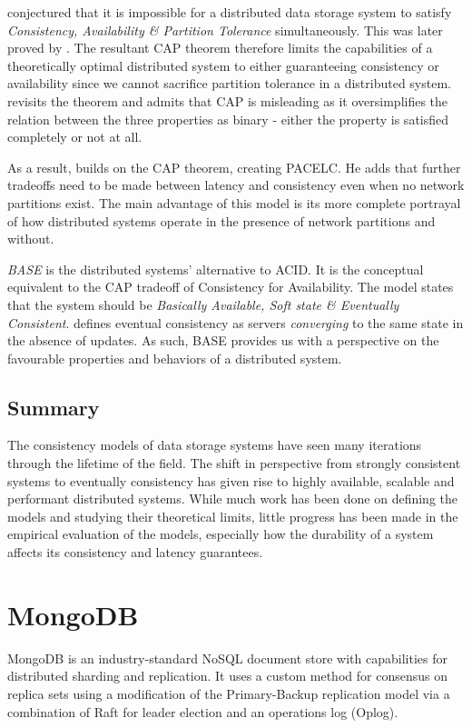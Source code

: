 \citet{cap} conjectured that it is impossible for a distributed data storage system to satisfy \textit{Consistency, Availability \& Partition Tolerance} simultaneously. This was later proved by \citet{cap-proof}. The resultant CAP theorem therefore limits the capabilities of a theoretically optimal distributed system to either guaranteeing consistency or availability since we cannot sacrifice partition tolerance in a distributed system. \citet{cap-years-after} revisits the theorem and admits that CAP is misleading as it oversimplifies the relation between the three properties as binary - either the property is satisfied completely or not at all. 

As a result, \citet{pacelc} builds on the CAP theorem, creating PACELC. He adds that further tradeoffs need to be made between latency and consistency even when no network partitions exist. The main advantage of this model is its more complete portrayal of how distributed systems operate in the presence of network partitions and without.

\textit{BASE} \citep{base} is the distributed systems' alternative to ACID. It is the conceptual equivalent to the CAP tradeoff of Consistency for Availability. The model states that the system should be \textit{Basically Available, Soft state \& Eventually Consistent}. \citet{eventual-consistency} defines eventual consistency as servers \textit{converging} to the same state in the absence of updates. As such, BASE provides us with a perspective on the favourable properties and behaviors of a distributed system.

\subsection{Summary}
The consistency models of data storage systems have seen many iterations through the lifetime of the field. The shift in perspective from strongly consistent systems to eventually consistency has given rise to highly available, scalable and performant distributed systems. While much work has been done on defining the models and studying their theoretical limits, little progress has been made in the empirical evaluation of the models, especially how the durability of a system affects its consistency and latency guarantees.

\section{MongoDB}
\label{sec:lit-mongo}
MongoDB is an industry-standard NoSQL document store with capabilities for distributed sharding and replication.  It uses a custom method for consensus on replica sets using a modification of the Primary-Backup replication model via a combination of Raft for leader election and an operations log (Oplog). 

